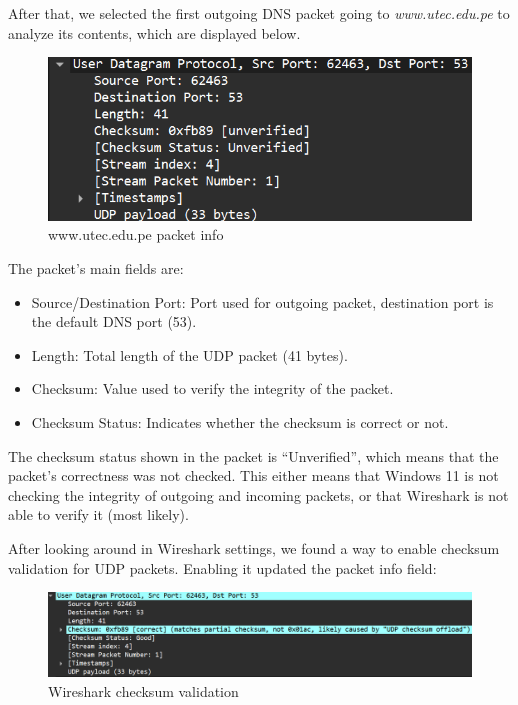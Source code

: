 After that, we selected the first outgoing DNS packet going to
\textit{www.utec.edu.pe} to analyze its contents, which are displayed below.

\begin{figure}[htbp]
	\centering
	\includegraphics[width=1\linewidth]{img/4.png}
	\caption{www.utec.edu.pe packet info}\label{fig:4}
\end{figure}

The packet's main fields are:

\begin{itemize}
	\item Source/Destination Port: Port used for outgoing packet, destination port is the
	      default DNS port (53).
	\item Length: Total length of the UDP packet (41 bytes).
	\item Checksum: Value used to verify the integrity of the packet.
	\item Checksum Status: Indicates whether the checksum is correct or not.
\end{itemize}

The checksum status shown in the packet is ``Unverified'', which means that the
packet's correctness was not checked. This either means that Windows 11 is not
checking the integrity of outgoing and incoming packets, or that Wireshark is
not able to verify it (most likely).

After looking around in Wireshark settings, we found a way to enable checksum
validation for UDP packets. Enabling it updated the packet info field:

\begin{figure}[htbp]
	\centering
	\includegraphics[width=1\linewidth]{img/5.png}
	\caption{Wireshark checksum validation}\label{fig:5}
\end{figure}

